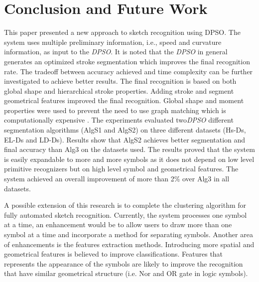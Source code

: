 \documentclass[preprint,10pt,5p,twocolumn]{elsarticle}
\begin{document}
\section{Conclusion and Future Work}
\label{ConclusionandFutureWork}

This paper presented a new approach to sketch recognition using DPSO. The system uses multiple preliminary information, i.e., speed and curvature information, as input to the \textit{DPSO}. It is noted that the \textit{DPSO} in general generates an optimized stroke segmentation which improves the final recognition rate.  The tradeoff between accuracy achieved and time complexity can be further investigated to achieve better results. The final recognition is based on both global shape and hierarchical stroke properties. Adding stroke and segment geometrical features improved the final recognition. Global shape and moment properties were used to prevent the need to use graph matching which is computationally expensive \cite{SketchRead2007}. The experiments evaluated two\textit{DPSO} different segmentation algorithms (AlgS1 and AlgS2) on three different datasets (Hs-Ds, EL-Ds and LD-Ds). Results show that AlgS2 achieves better segmentation and final accuracy than Alg3 \cite{earlyprocess} on the datasets used. The results proved that the system is easily expandable to more and more symbols as it does not depend on low level primitive recognizers but on high level symbol and geometrical features.  The system achieved an overall improvement of more than 2\% over Alg3 in all datasets.  %

 A possible extension of this research is to complete the clustering algorithm for fully automated sketch recognition. Currently, the system processes one symbol at a time, an enhancement would be to allow users to draw more than one symbol at a time and incorporate a method for separating symbols. Another area of enhancements is the features extraction methods. Introducing more spatial and geometrical features is believed to improve classifications. Features that represents the appearance of the symbols are likely to improve the recognition that have similar geometrical structure (i.e. Nor and OR gate in logic symbols).  
  
%

\end{document}
